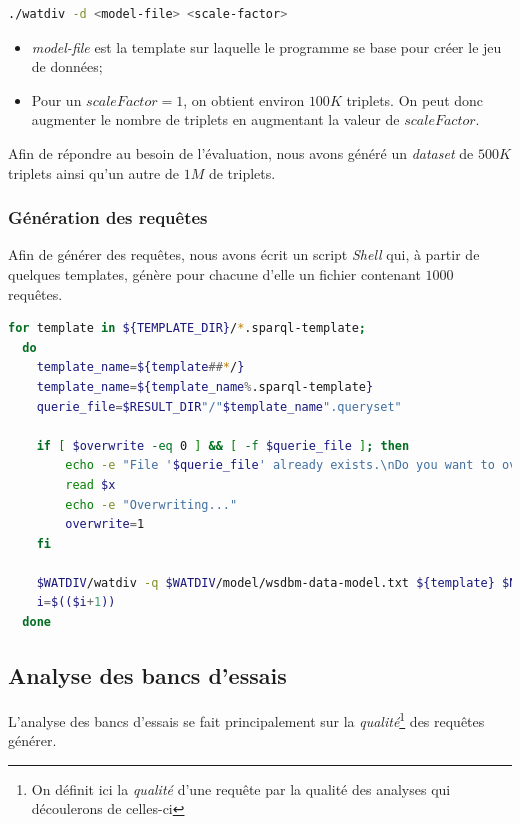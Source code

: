 \documentclass[12pt,titlepage]{article}
\begin{document}
\begin{lstlisting}[language=bash,caption=Commande pour la création  d'un dataset]
  ./watdiv -d <model-file> <scale-factor>
\end{lstlisting}

\begin{itemize}
  \item \textit{model-file} est la template sur laquelle le programme se base pour créer le jeu de données;
  \item Pour un $scaleFactor = 1$, on obtient environ $100K$ triplets. On peut donc augmenter le nombre de triplets en augmentant la valeur de $scaleFactor$.
\end{itemize}

Afin de répondre au besoin de l'évaluation, nous avons généré un \textit{dataset} de $500K$ triplets ainsi qu'un autre de $1M$ de triplets.

\subsubsection{Génération des requêtes}

Afin de générer des requêtes, nous avons écrit un script \textit{Shell} qui, à partir de quelques templates, génère pour chacune d'elle un fichier contenant $1000$ requêtes.

\begin{lstlisting}[language=bash, caption="Extrait du script qui génére les requêtes]
  for template in ${TEMPLATE_DIR}/*.sparql-template;
  do 
    template_name=${template##*/}
    template_name=${template_name%.sparql-template}
    querie_file=$RESULT_DIR"/"$template_name".queryset"

    if [ $overwrite -eq 0 ] && [ -f $querie_file ]; then
        echo -e "File '$querie_file' already exists.\nDo you want to overwrite ? (any key to continue / CTRL-C to exit)"
        read $x
        echo -e "Overwriting..."
        overwrite=1
    fi

    $WATDIV/watdiv -q $WATDIV/model/wsdbm-data-model.txt ${template} $NB_QUERIES 1 > $querie_file
    i=$(($i+1))
  done
\end{lstlisting}

\subsection{Analyse des bancs d’essais}

L'analyse des bancs d'essais se fait principalement sur la \textit{qualité}\footnote{On définit ici la \textit{qualité} d'une requête par la qualité des analyses qui découlerons de celles-ci} des requêtes générer.
\end{document}
